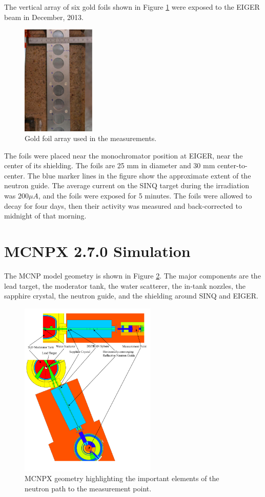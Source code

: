 \documentclass[a4paper,
              ]{jacow}
\begin{document}
The vertical array of six gold foils shown in Figure \ref{foils} were exposed to the EIGER beam in December, 2013.   

\begin{figure}[!htb]
   \centering
   \includegraphics*[width=35mm]{graphics/foils.eps}
   \caption{Gold foil array used in the measurements.}
   \label{foils}
\end{figure}

The foils were placed near the monochromator position at EIGER, near the center of its shielding.  The foils are 25 mm in diameter and 30 mm center-to-center.  The blue marker lines in the figure show the approximate extent of the neutron guide.  The average current on the SINQ target during the irradiation was $200 \mu A$, and the foils were exposed for 5 minutes.  The foils were allowed to decay for four days, then their activity was measured and back-corrected to midnight of that morning.


\section{MCNPX 2.7.0 Simulation}

The MCNP model geometry is shown in Figure \ref{geom}.  The major components are the lead target, the moderator tank, the water scatterer, the in-tank nozzles, the sapphire crystal, the neutron guide, and the shielding around SINQ and EIGER.

\begin{figure}[!htb]
   \centering
   \includegraphics*[trim = 0mm 25mm 0mm 10mm, width=65mm]{graphics/geom.pdf}
   \caption{MCNPX geometry highlighting the important elements of the neutron path to the measurement point.}
   \label{geom}
\end{figure}
\end{document}
